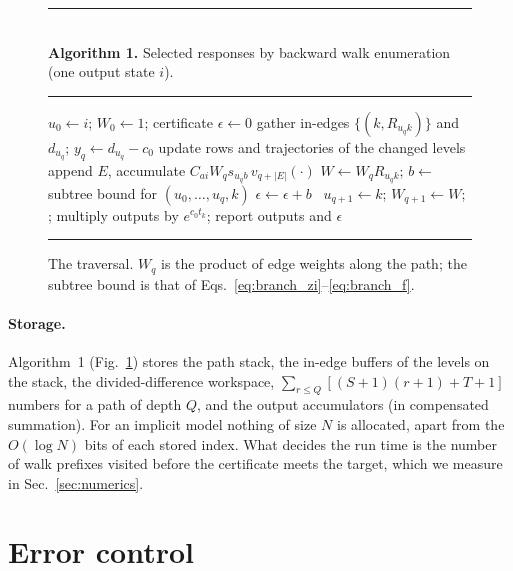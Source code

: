 \documentclass[aps,pra,superscriptaddress,floatfix,longbibliography,twocolumn]{revtex4-2}
\begin{document}
\begin{figure}[t]
\small
\noindent\rule{\linewidth}{0.4pt}\\[-2pt]
\textbf{Algorithm 1.} Selected responses by backward walk enumeration (one output state $i$).\\[-6pt]
\noindent\rule{\linewidth}{0.4pt}
\begin{algorithmic}[1]
\State $u_0\gets i$; $W_0\gets1$; certificate $\epsilon\gets0$
  \State gather in-edges $\{(k,R_{u_qk})\}$ and $d_{u_q}$; $y_q\gets d_{u_q}-c_0$
     \State update rows and trajectories of the changed levels
      append $E$, accumulate $C_{ai}W_q s_{u_qb}\,v_{q+|E|}(\cdot)$ \EndFor
  \EndIf
     \State $W\gets W_qR_{u_qk}$; $b\gets$ subtree bound for $(u_0,\dots,u_q,k)$
      $\epsilon\gets\epsilon+b$ 
     \Else\ $u_{q+1}\gets k$; $W_{q+1}\gets W$; 
     \EndIf
  \EndFor
\EndProcedure
\State {}; multiply outputs by $e^{c_0t_k}$; report outputs and $\epsilon$
\end{algorithmic}
\noindent\rule{\linewidth}{0.4pt}
\caption{The traversal. $W_q$ is the product of edge weights along the path; the subtree bound is that of Eqs.~\eqref{eq:branch_zi}--\eqref{eq:branch_f}.}\label{alg:walk}
\end{figure}

\paragraph*{Storage.} Algorithm~1 (Fig.~\ref{alg:walk}) stores the path stack, the in-edge buffers of the levels on the stack, the divided-difference workspace, $\sum_{r\le Q}[(S+1)(r+1)+T+1]$ numbers for a path of depth $Q$, and the output accumulators (in compensated summation). For an implicit model nothing of size $N$ is allocated, apart from the $O(\log N)$ bits of each stored index. What decides the run time is the number of walk prefixes visited before the certificate meets the target, which we measure in Sec.~\ref{sec:numerics}.

\section{Error control}\label{sec:error}
\end{document}
